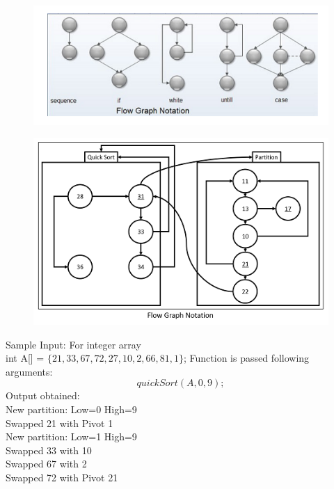 \documentclass[10pt,a4paper]{article}
\begin{document}
				\begin{figure}[h!]
					\centering
					\includegraphics[scale=0.5]{pqr.png}
				\end{figure}
			
			\begin{figure}[h!]
					\centering
					\includegraphics{hjv.png}
				\end{figure}	
			\noindent Sample Input: For integer array\\
			int A[] = $\{ 21,33,67,72,27,10,2,66,81,1\}$;
			Function is passed following arguments:\\
			$$quickSort(A, 0, 9);$$
			Output obtained:\\
			
			\noindent
			New partition: Low=0 High=9\\
			Swapped 21 with Pivot 1\\
			
			\noindent
			New partition: Low=1 High=9\\
			Swapped 33 with 10\\
			Swapped 67 with 2\\
			Swapped 72 with Pivot 21\\
			
\end{document}
